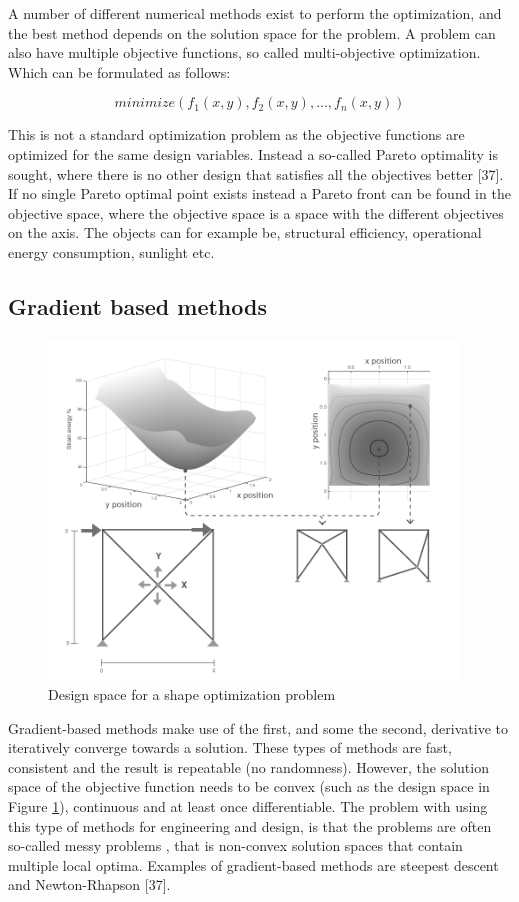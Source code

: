  A number of different numerical methods exist to perform the optimization, and the best method depends on the solution space for the problem. A problem can also have multiple objective functions, so called multi-objective optimization. Which can be formulated as follows:

\begin{equation*}
minimize(f_1(x,y),f_2(x,y), \dotsc, f_n(x,y))
\end{equation*}

This is not a standard optimization problem as the objective functions are optimized for the same design variables. Instead a so-called Pareto optimality is sought, where there is no other design that satisfies all the objectives better [37]. If no single Pareto optimal point exists instead a Pareto front can be found in the objective space, where the objective space is a space with the different objectives on the axis. The objects can for example be, structural efficiency, operational energy consumption, sunlight etc.

\subsection{Gradient based methods}
\begin{figure}
  \includegraphics[width=310pt]{graphics/designspace.png}
  \caption{Design space for a shape optimization problem}
  \label{fig:designspace}
\end{figure}

Gradient-based methods make use of the first, and some the second, derivative to iteratively converge towards a solution. These types of methods are fast, consistent and the result is repeatable (no randomness). However, the solution space of the objective function needs to be convex (such as the design space in Figure \ref{fig:designspace}), continuous and at least once differentiable. The problem with using this type of methods for engineering and design, is that the problems are often so-called messy problems \cite{schlaich2006challenges}, that is non-convex solution spaces that contain multiple local optima. Examples of gradient-based methods are steepest descent and Newton-Rhapson [37]. 

